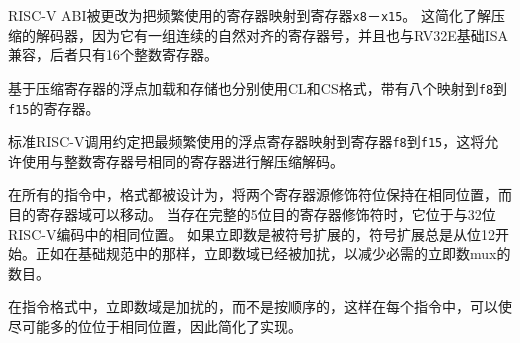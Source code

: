 \begin{commentary}
RISC-V ABI被更改为把频繁使用的寄存器映射到寄存器{\tt x8}－{\tt x15}。
这简化了解压缩的解码器，因为它有一组连续的自然对齐的寄存器号，并且也与RV32E基础ISA兼容，后者只有16个整数寄存器。
\end{commentary}

基于压缩寄存器的浮点加载和存储也分别使用CL和CS格式，带有八个映射到{\tt f8}到{\tt f15}的寄存器。

\begin{commentary}
标准RISC-V调用约定把最频繁使用的浮点寄存器映射到寄存器{\tt f8}到{\tt f15}，这将允许使用与整数寄存器号相同的寄存器进行解压缩解码。
\end{commentary}

在所有的指令中，格式都被设计为，将两个寄存器源修饰符位保持在相同位置，而目的寄存器域可以移动。
当存在完整的5位目的寄存器修饰符时，它位于与32位RISC-V编码中的相同位置。
如果立即数是被符号扩展的，符号扩展总是从位12开始。正如在基础规范中的那样，立即数域已经被加扰，以减少必需的立即数mux的数目。

\begin{commentary}
在指令格式中，立即数域是加扰的，而不是按顺序的，这样在每个指令中，可以使尽可能多的位位于相同位置，因此简化了实现。
\end{commentary}

